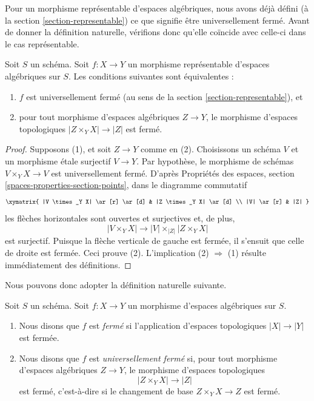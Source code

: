 \noindent
Pour un morphisme représentable d'espaces algébriques, nous avons déjà défini (à la
section \ref{section-representable})
ce que signifie être universellement fermé. Avant de donner la définition
naturelle, vérifions donc qu'elle coïncide avec celle-ci dans le cas représentable.

\begin{lemma}
\label{lemma-characterize-representable-universally-closed}
Soit $S$ un schéma. Soit $f : X \to Y$ un morphisme représentable
d'espaces algébriques sur $S$. Les conditions suivantes sont équivalentes :
\begin{enumerate}
\item $f$ est universellement fermé
(au sens de la section \ref{section-representable}), et
\item pour tout morphisme d'espaces algébriques $Z \to Y$, le morphisme
d'espaces topologiques $|Z \times_Y X| \to |Z|$ est fermé.
\end{enumerate}
\end{lemma}

\begin{proof}
Supposons (1), et soit $Z \to Y$ comme en (2). Choisissons un schéma $V$ et
un morphisme \'etale surjectif $V \to Y$. Par hypothèse, le morphisme
de schémas $V \times_Y X \to V$ est universellement fermé. D'après
Propriétés des espaces, section \ref{spaces-properties-section-points},
dans le diagramme commutatif
$$
\xymatrix{
|V \times_Y X| \ar[r] \ar[d] & |Z \times_Y X| \ar[d] \\
|V| \ar[r] & |Z|
}
$$
les flèches horizontales sont ouvertes et surjectives et, de plus,
$$
|V \times_Y X| \longrightarrow |V| \times_{|Z|} |Z \times_Y X|
$$
est surjectif. Puisque la flèche verticale
de gauche est fermée, il s'ensuit que celle de droite est
fermée. Ceci prouve (2). L'implication (2) $\Rightarrow$ (1) résulte
immédiatement des définitions.
\end{proof}

\noindent
Nous pouvons donc adopter la définition naturelle suivante.

\begin{definition}
\label{definition-closed}
Soit $S$ un schéma. Soit $f : X \to Y$ un morphisme d'espaces algébriques
sur $S$.
\begin{enumerate}
\item Nous disons que $f$ est {\it fermé} si l'application d'espaces
topologiques $|X| \to |Y|$ est fermée.
\item Nous disons que $f$ est {\it universellement fermé} si, pour tout morphisme
d'espaces algébriques $Z \to Y$, le morphisme d'espaces topologiques
$$
|Z \times_Y X| \to |Z|
$$
est fermé, c'est-à-dire si le changement de base $Z \times_Y X \to Z$ est fermé.
\end{enumerate}
\end{definition}

